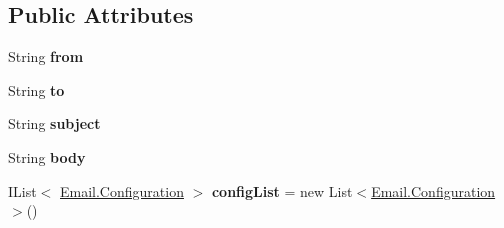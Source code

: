 \subsection*{Public Attributes}
\begin{DoxyCompactItemize}
\item 
\hypertarget{classcom_1_1shephertz_1_1app42_1_1paas_1_1sdk_1_1csharp_1_1email_1_1_email_ae2f78c8a08e2ad0b1c80f47621aac914}{String {\bfseries from}}\label{classcom_1_1shephertz_1_1app42_1_1paas_1_1sdk_1_1csharp_1_1email_1_1_email_ae2f78c8a08e2ad0b1c80f47621aac914}

\item 
\hypertarget{classcom_1_1shephertz_1_1app42_1_1paas_1_1sdk_1_1csharp_1_1email_1_1_email_a1fdfa79892abbf30fde52aa773a49b3c}{String {\bfseries to}}\label{classcom_1_1shephertz_1_1app42_1_1paas_1_1sdk_1_1csharp_1_1email_1_1_email_a1fdfa79892abbf30fde52aa773a49b3c}

\item 
\hypertarget{classcom_1_1shephertz_1_1app42_1_1paas_1_1sdk_1_1csharp_1_1email_1_1_email_aa07cf38944730c59225364a5130db1bf}{String {\bfseries subject}}\label{classcom_1_1shephertz_1_1app42_1_1paas_1_1sdk_1_1csharp_1_1email_1_1_email_aa07cf38944730c59225364a5130db1bf}

\item 
\hypertarget{classcom_1_1shephertz_1_1app42_1_1paas_1_1sdk_1_1csharp_1_1email_1_1_email_a0b929ddaee0169051957af7fa20a5478}{String {\bfseries body}}\label{classcom_1_1shephertz_1_1app42_1_1paas_1_1sdk_1_1csharp_1_1email_1_1_email_a0b929ddaee0169051957af7fa20a5478}

\item 
\hypertarget{classcom_1_1shephertz_1_1app42_1_1paas_1_1sdk_1_1csharp_1_1email_1_1_email_acbccbaf8222d717ff23679e43e49eae3}{I\+List$<$ \hyperlink{classcom_1_1shephertz_1_1app42_1_1paas_1_1sdk_1_1csharp_1_1email_1_1_email_1_1_configuration}{Email.\+Configuration} $>$ {\bfseries config\+List} = new List$<$\hyperlink{classcom_1_1shephertz_1_1app42_1_1paas_1_1sdk_1_1csharp_1_1email_1_1_email_1_1_configuration}{Email.\+Configuration}$>$()}\label{classcom_1_1shephertz_1_1app42_1_1paas_1_1sdk_1_1csharp_1_1email_1_1_email_acbccbaf8222d717ff23679e43e49eae3}

\end{DoxyCompactItemize}
